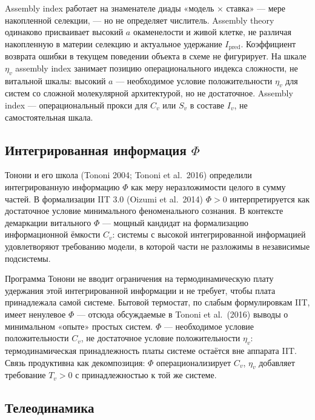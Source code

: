 \documentclass[pdflatex,sn-mathphys-ay]{sn-jnl}
\begin{document}
Assembly index работает на знаменателе диады «модель × ставка» --- мере накопленной селекции, --- но не определяет числитель. Assembly theory одинаково присваивает высокий \(a\) окаменелости и живой клетке, не различая накопленную в материи селекцию и актуальное удержание \(I_{\text{pred}}\). Коэффициент возврата ошибки в текущем поведении объекта в схеме не фигурирует. На шкале \(\eta_v\) assembly index занимает позицию операционального индекса сложности, не витальной шкалы: высокий \(a\) --- необходимое условие положительности \(\eta_v\) для систем со сложной молекулярной архитектурой, но не достаточное. Assembly index --- операциональный прокси для \(C_v\) или \(S_v\) в составе \(I_v\), не самостоятельная шкала.

\subsection{\texorpdfstring{Интегрированная информация \(\Phi\)}{Интегрированная информация \textbackslash Phi}}\label{ux438ux43dux442ux435ux433ux440ux438ux440ux43eux432ux430ux43dux43dux430ux44f-ux438ux43dux444ux43eux440ux43cux430ux446ux438ux44f-phi}

Тонони и его школа (Tononi 2004; Tononi et al.~2016) определили интегрированную информацию \(\Phi\) как меру неразложимости целого в сумму частей. В формализации IIT 3.0 (Oizumi et al.~2014) \(\Phi > 0\) интерпретируется как достаточное условие минимального феноменального сознания. В контексте демаркации витального \(\Phi\) --- мощный кандидат на формализацию информационной ёмкости \(C_v\): системы с высокой интегрированной информацией удовлетворяют требованию модели, в которой части не разложимы в независимые подсистемы.

Программа Тонони не вводит ограничения на термодинамическую плату удержания этой интегрированной информации и не требует, чтобы плата принадлежала самой системе. Бытовой термостат, по слабым формулировкам IIT, имеет ненулевое \(\Phi\) --- отсюда обсуждаемые в Tononi et al.~(2016) выводы о минимальном «опыте» простых систем. \(\Phi\) --- необходимое условие положительности \(C_v\), не достаточное условие положительности \(\eta_v\): термодинамическая принадлежность платы системе остаётся вне аппарата IIT. Связь продуктивна как декомпозиция: \(\Phi\) операционализирует \(C_v\), \(\eta_v\) добавляет требование \(T_v > 0\) с принадлежностью к той же системе.

\subsection{Телеодинамика}\label{ux442ux435ux43bux435ux43eux434ux438ux43dux430ux43cux438ux43aux430}
\end{document}
